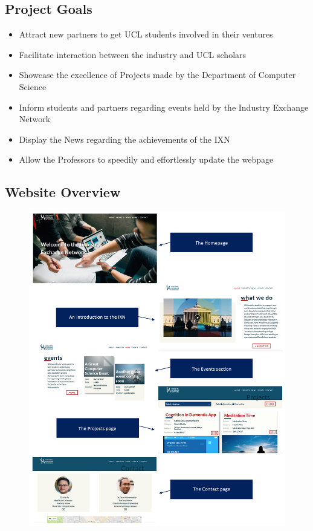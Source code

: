\documentclass[fontsize=10pt]{extarticle}
\numberwithin{figure}{section} %
\begin{document}
\hypertarget{project-goals}{%
\subsection{Project Goals}\label{project-goals}}

\begin{itemize}
\item
  Attract new partners to get UCL students involved in their ventures
\item
  Facilitate interaction between the industry and UCL scholars
\item
  Showcase the excellence of Projects made by the Department of Computer
  Science
\item
  Inform students and partners regarding events held by the Industry
  Exchange Network
\item
  Display the News regarding the achievements of the IXN
\item
  Allow the Professors to speedily and effortlessly update the webpage
\end{itemize}

\hypertarget{website-overview}{%
\subsection{Website Overview}\label{website-overview}}

\begin{figure}[H]
      \centering
      \includegraphics[trim = 0 0 0 0, clip, width=1\textwidth]{ph13.png}
 \end{figure}
\end{document}
